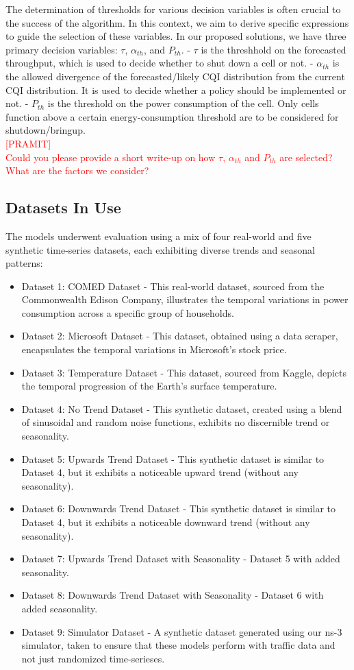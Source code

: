 The determination of thresholds for various decision variables is often crucial to the success of the algorithm. 
In this context, we aim to derive specific expressions to guide the selection of these variables.
In our proposed solutions, we have three primary decision variables: $\tau$, $\alpha_{th}$, and $P_{th}$.
- $\tau$ is the threshhold on the forecasted throughput, which is used to decide whether to shut down a cell or not.
- $\alpha_{th}$ is the allowed divergence of the forecasted/likely CQI distribution from the current CQI distribution. It is used to decide whether a policy should be implemented or not.
- $P_{th}$ is the threshold on the power consumption of the cell. Only cells function above a certain energy-consumption threshold are to be considered for shutdown/bringup.
\\
\textcolor{red}{[PRAMIT] \\
Could you please provide a short write-up on how $\tau$, $\alpha_{th}$ and $P_{th}$ are selected? What are the factors we consider?}

\subsection{Datasets In Use}

The models underwent evaluation using a mix of four real-world and five synthetic time-series datasets, each exhibiting diverse trends and seasonal patterns:

\begin{itemize}
  \item Dataset 1: COMED Dataset - This real-world dataset, sourced from the Commonwealth Edison Company, illustrates the temporal variations in power consumption across a specific group of households.
  \item Dataset 2: Microsoft Dataset - This dataset, obtained using a data scraper, encapsulates the temporal variations in Microsoft's stock price.
  \item Dataset 3: Temperature Dataset - This dataset, sourced from Kaggle, depicts the temporal progression of the Earth's surface temperature.
  \item Dataset 4: No Trend Dataset - This synthetic dataset, created using a blend of sinusoidal and random noise functions, exhibits no discernible trend or seasonality.
  \item Dataset 5: Upwards Trend Dataset - This synthetic dataset is similar to Dataset 4, but it exhibits a noticeable upward trend (without any seasonality).
  \item Dataset 6: Downwards Trend Dataset - This synthetic dataset is similar to Dataset 4, but it exhibits a noticeable downward trend (without any seasonality).
  \item Dataset 7: Upwards Trend Dataset with Seasonality - Dataset 5 with added seasonality.
  \item Dataset 8: Downwards Trend Dataset with Seasonality - Dataset 6 with added seasonality.
  \item Dataset 9: Simulator Dataset - A synthetic dataset generated using our ns-3 simulator, taken to ensure that these models perform with traffic data and not just randomized time-serieses.
\end{itemize}

